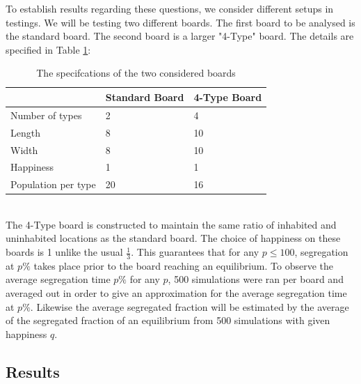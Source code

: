 To establish results regarding these questions, we consider different setups in testings. We will be testing two different boards.
The first board to be analysed is the standard board. The second board is a larger 
"4-Type" board. The details are specified in Table \ref{tab:specs}:
\begin{table}[h!]
\centering
\caption{The specifcations of the two considered boards}
\label{tab:specs}
\begin{tabular}{l|l|l}
  & Standard Board & 4-Type Board\\ \hline
Number of types & 2 & 4 \\ 
 Length & 8 & 10  \\
 Width & 8 & 10  \\
 Happiness & 1 & 1  \\
Population per type & 20 & 16  
\end{tabular}
\end{table}
\\
The 4-Type board is constructed to maintain the same ratio of inhabited and uninhabited locations as the standard board. The choice of happiness on these boards is 1 unlike the usual \(\frac{1}{3}\). 
This guarantees that for any \(p\leq 100\), segregation at \(p\%\) takes place prior to the board reaching an equilibrium. 
To observe the average segregation time \(p\%\) for any \(p\), 500 simulations were ran per board and averaged out in order to give an approximation for the average segregation time at \(p\%\).
Likewise the average segregated fraction will be estimated by the average of the segregated fraction of an equilibrium from 500 simulations with given happiness \(q\).

\subsection{Results}

